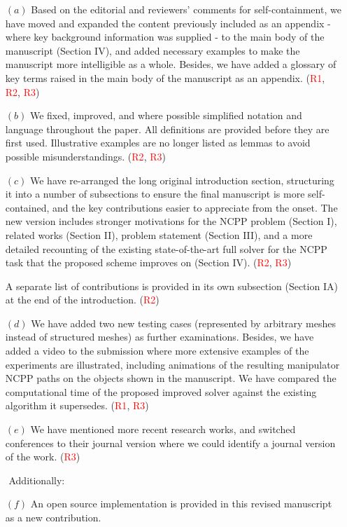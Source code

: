 \documentclass[11pt]{article}
\begin{document}
\begin{enumerate}
\item[$(a)$] Based on the editorial and reviewers' comments for self-containment, we have moved and expanded the content previously included as an appendix - where key background information was supplied - to the main body of the manuscript (Section IV), and added necessary examples to make the manuscript more intelligible as a whole.
Besides, we have added a glossary of key terms raised in the main body of the manuscript as an appendix. 
(\textcolor{red}{R1}, \textcolor{red}{R2}, \textcolor{red}{R3})
\item[$(b)$] We fixed, improved, and where possible simplified notation and language throughout the paper. All definitions are provided before they are first used. Illustrative examples are no longer listed as lemmas to avoid possible misunderstandings. 
(\textcolor{red}{R2}, \textcolor{red}{R3})
\item[$(c)$] We have re-arranged the long original introduction section, structuring it into a number of subsections to ensure the final manuscript is more self-contained, and the key contributions easier to appreciate from the onset. The new version includes stronger motivations for the NCPP problem (Section I), related works (Section II), problem statement (Section III), and a more detailed recounting of the existing state-of-the-art full solver for the NCPP task that the proposed scheme improves on (Section IV).  %
(\textcolor{red}{R2}, \textcolor{red}{R3})

A separate list of contributions is provided in its own subsection (Section IA) at the end of the introduction. 
(\textcolor{red}{R2})
\item[$(d)$]  We have added two new testing cases (represented by arbitrary meshes instead of structured meshes) as further examinations. Besides, we have added a video to the submission where more extensive examples of the experiments are illustrated, including animations of the resulting manipulator NCPP paths on the objects shown in the manuscript. 
We have compared the computational time of the proposed improved solver against the existing algorithm it supersedes.
(\textcolor{red}{R1}, \textcolor{red}{R3})
\item[$(e)$] We have mentioned more recent research works, and switched conferences to their journal version where we could identify a journal version of the work. (\textcolor{red}{R3})

\item[$ $] Additionally: 


\item[$(f)$] An open source implementation is provided in this revised manuscript as a new contribution. 
\end{enumerate}
 \clearpage
\end{document}
